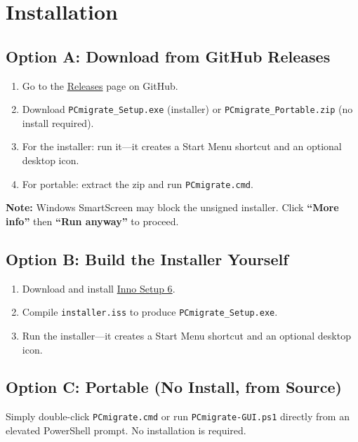 \documentclass[11pt,a4paper]{article}
\begin{document}
\section{Installation}

\subsection{Option A: Download from GitHub Releases}

\begin{enumerate}
    \item Go to the \href{https://github.com/rory/PCmigrate/releases}{Releases} page on GitHub.
    \item Download \texttt{PCmigrate\_Setup.exe} (installer) or \texttt{PCmigrate\_Portable.zip} (no install required).
    \item For the installer: run it---it creates a Start Menu shortcut and an optional desktop icon.
    \item For portable: extract the zip and run \texttt{PCmigrate.cmd}.
\end{enumerate}

\noindent\textbf{Note:} Windows SmartScreen may block the unsigned installer. Click \textbf{``More info''} then \textbf{``Run anyway''} to proceed.

\subsection{Option B: Build the Installer Yourself}

\begin{enumerate}
    \item Download and install \href{https://jrsoftware.org/isinfo.php}{Inno Setup 6}.
    \item Compile \texttt{installer.iss} to produce \texttt{PCmigrate\_Setup.exe}.
    \item Run the installer---it creates a Start Menu shortcut and an optional desktop icon.
\end{enumerate}

\subsection{Option C: Portable (No Install, from Source)}

Simply double-click \texttt{PCmigrate.cmd} or run \texttt{PCmigrate-GUI.ps1} directly from an elevated PowerShell prompt. No installation is required.
\end{document}
